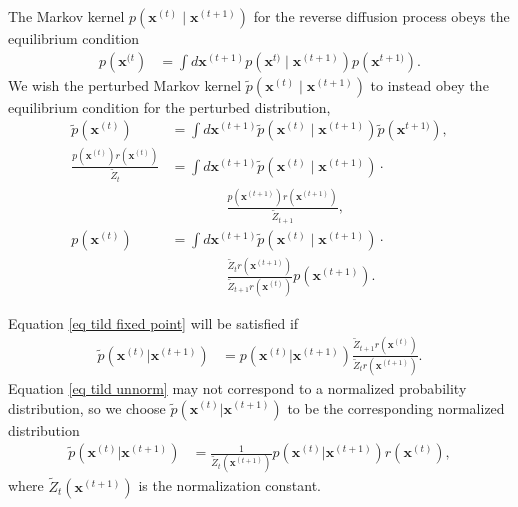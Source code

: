 \documentclass{article}
\newcommand{\mb}{\mathbf}
\begin{document}
The Markov kernel $p\left( \mb x^{(t)} \mid \mb x^{(t+1)}\right)$ for the reverse diffusion process obeys the equilibrium condition
\begin{align}
p\left( \mb x^{(t} \right) &= \int d \mb x^{(t+1)} p\left( \mb x^{t)} \mid \mb x^{(t+1)} \right) p\left( \mb x^{t+1)} \right)
.
\end{align}
We wish the perturbed Markov kernel $\tilde{p}\left( \mb x^{(t)} \mid \mb x^{(t+1)}\right)$ to instead obey the equilibrium condition for the perturbed distribution,
\begin{align}
\tilde{p}\left( \mb x^{(t)} \right) &= \int d \mb x^{(t+1)} \tilde{p}\left( \mb x^{(t)} \mid \mb x^{(t+1)} \right) \tilde{p}\left( \mb x^{t+1)} \right), \\
\frac{
	p\left(\mb x^{(t)} \right) r\left( \mb x^{(t)} \right)
	}{\tilde{Z}_t}
&= \int d \mb x^{(t+1)} \tilde{p}\left( \mb x^{(t)} \mid \mb x^{(t+1)} \right) 
\cdot \nonumber\\  & \qquad \qquad
	\frac{
	p\left(\mb x^{(t+1)} \right) r\left( \mb x^{(t+1)} \right)
	}{\tilde{Z}_{t+1}}
,\\
p\left(\mb x^{(t)} \right)
&= \int d \mb x^{(t+1)} \tilde{p}\left( \mb x^{(t)} \mid \mb x^{(t+1)} \right) 
\cdot \nonumber\\  & \qquad \qquad
	\frac{
	 	\tilde{Z}_t r\left( \mb x^{(t+1)} \right)
	}{
		\tilde{Z}_{t+1} r\left( \mb x^{(t)} \right)
	} p\left(\mb x^{(t+1)} \right)
	\label{eq tild fixed point}
.
\end{align}

Equation \ref{eq tild fixed point} will be satisfied if
\begin{align}
\tilde{p}\left( \mb x^{(t)} | \mb x^{(t+1)} \right) &= p\left( \mb x^{(t)} | \mb x^{(t+1)} \right) 
	\frac{
		\tilde{Z}_{t+1} r\left( \mb x^{(t)} \right)
	}{
	 	\tilde{Z}_t r\left( \mb x^{(t+1)} \right)
	}
\label{eq tild unnorm}
.
\end{align}
Equation \ref{eq tild unnorm} may not correspond to a normalized probability distribution, so we choose $\tilde{p}\left( \mb x^{(t)} | \mb x^{(t+1)} \right)$ to be the corresponding normalized distribution
\begin{align}
\tilde{p}\left( \mb x^{(t)} | \mb x^{(t+1)} \right) &= \frac{1}{\tilde{Z}_t\left( \mb x^{(t+1)} \right)} p\left( \mb x^{(t)} | \mb x^{(t+1)} \right) r\left( \mb x^{(t)} \right)
\label{eq tild norm}
,
\end{align}
where $\tilde{Z}_t\left( \mb x^{(t+1)} \right)$ is the normalization constant.
\end{document}
